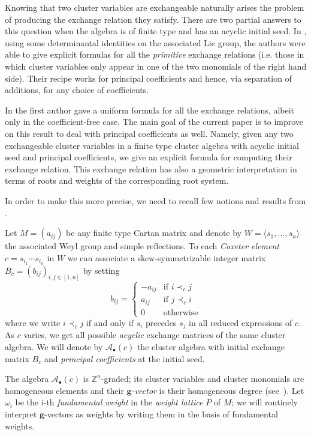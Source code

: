 \documentclass[11pt]{amsart}
\newcommand{\cA}{\mathcal{A}}
\newcommand{\ZZ}{\mathbb{Z}}
\newcommand{\bg}{\mathbf{g}}
\newcommand{\A}{{M}}
\theoremstyle{definition}
\numberwithin{equation}{section}
\numberwithin{figure}{section}
\begin{document}
Knowing that two cluster variables are exchangeable naturally arises the problem of producing the exchange relation they satisfy. 
  There are two partial answers to this question when the algebra is of finite type and has an acyclic initial seed. 
  In \cite{YZ08}, using some determinantal identities on the associated Lie group, the authors were able to give explicit formulas for all the \emph{primitive} exchange relations (i.e. those in which cluster variables only appear in one of the two monomials of the right hand side). 
  Their recipe works for principal coefficients and hence, via separation of additions, for any choice of coefficients.

  In \cite{Ste13} the first \say[PT]{} author gave a uniform formula for all the exchange relations, albeit only in the coefficient-free case.
  The main goal of the current paper is to improve on this result to deal with principal coefficients as well. Namely, given any two exchangeable cluster variables in a finite type cluster algebra with acyclic initial seed and principal coefficients, we give an explicit formula for computing their exchange relation. This exchange relation has also a geometric interpretation in terms of roots and weights of the corresponding root system.

 
 In order to make this more precise, we need to recall few notions and results from \cite{Ste13,YZ08}.

  Let $\A=(a_{ij})$ be any finite type {Cartan matrix} and denote by $W=\langle s_1,\dots,s_n\rangle$ the associated {Weyl group} and {simple reflections}.
  To each \emph{Coxeter element} $c=s_{i_1}\cdots s_{i_n}$ in $W$ we can associate a skew-symmetrizable integer matrix $B_c=(b_{ij})_{i,j\in[1,n]}$ by setting
  \[
    b_{ij}=
    \begin{cases}
      -a_{ij} & \text{if } i\prec_c j  \\
      a_{ij}  & \text{if } j\prec_c i  \\
      0       & \text{otherwise}
    \end{cases}
  \]
  where we write $i\prec_c j$ if and only if $s_i$ precedes $s_j$ in all reduced expressions of $c$.
  As $c$ varies, we get all possible \emph{acyclic} exchange matrices of the same cluster algebra.
  We will denote by $\cA_\bullet(c)$ 
   the cluster algebra with initial exchange matrix $B_c$ and  \emph{principal coefficients} at the initial seed.

  The algebra $\cA_\bullet(c)$ is $\ZZ^n$-graded; its cluster variables and cluster monomials are homogeneous elements and their \emph{$\bg$-vector} is their homogeneous degree (see~\cite[Section~6]{FZ07}).\say[PT]{}
  Let $\omega_i$ be the i-th \emph{fundamental weight} in the \emph{weight lattice} $P$ of $\A$; we will routinely interpret $\bg$-vectors as weights by writing them in the basis of fundamental weights.
\end{document}
